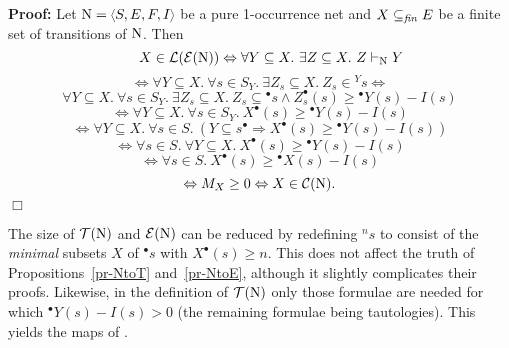 \documentclass[twocolumn]{article}
\newcommand{\out}[1]{}        \newcommand{\ams}[1]{#1}      \usepackage[preserveurlmacro]{breakurl}
\newtheorem{prop}{Proposition}[section]
\newenvironment{proposition}[1]{\begin{prop} \rm \label{pr-#1} }{\end{prop}}
\newenvironment{proof}{\begin{trivlist} \item[\hspace{\labelsep}\bf
Proof:]}{\hfill $\Box$\end{trivlist}}
\newcommand{\turn}{\vdash}                              \newcommand{\dbigcup}{\bigcup_{\uparrow}}		\newcommand{\nbigcup}{\bigcup_{\bullet}}		\newcommand{\nbigcap}{\bigcap_{\bullet}}		\newcommand{\bbigcup}{\overline{\bigcup}}		\newcommand{\bbigcap}{\overline{\bigcap}}		\newcommand{\nbbigcap}{\bbigcap_{\bullet}}		\newcommand{\fbbigcup}{\overline{\bigcup}^f}		\newcommand{\bbbigcup}{\overline{\bigcup}^2}		\newcommand{\dcup}{~~\makebox[0pt]{\LARGE$\cdot$}\makebox[0pt]{$\cup$}~~}
\begin{document}
\begin{proof}
Let $\eN=\tuple{S,E,F,I}$ be a pure 1-occurrence net and
$X\subseteq_{\it fin} E$ be a finite set of transitions of ${\rm N}$.
Then\vspace{-2em}$$$$
$$\mbox{~~~~~} X \in \fL(\fE(\eN)) \Leftrightarrow \forall Y\subseteq X.~
\exists Z \subseteq X.~ Z \turn_\eN Y$$
$$\Leftrightarrow\forall Y\subseteq X.~\forall s\in S_Y.~\exists Z_s
\subseteq X.~ Z_s\in\mbox{$^Y\!\!s$}\Leftrightarrow$$
$$\forall Y\!\subseteq\! X.~\forall s\!\in\! S_Y.~\exists Z_s
\!\subseteq\! X.~ Z_s \!\subseteq\! \mbox{$^\bullet s$} \wedge
Z_s^\bullet\!(s) \!\geq\! \mbox{$^\bullet Y\!(s)$}-I(s)$$
$$\Leftrightarrow\forall Y\!\subseteq\! X.~\forall s\!\in\! S_Y.~
X^\bullet\!(s) \geq \mbox{$^\bullet Y(s)$}-I(s)$$
$$\Leftrightarrow\forall Y\!\subseteq\! X.~\forall s\!\in\! S.~
(Y\!\subseteq\! s^\bullet \Rightarrow
X^\bullet\!(s) \geq \mbox{$^\bullet Y(s)$}-I(s))$$
$$\Leftrightarrow\forall s\!\in\! S.~\forall Y\!\subseteq\! X.~
X^\bullet\!(s) \geq \mbox{$^\bullet Y(s)$}-I(s)$$
$$\Leftrightarrow\forall s\!\in\! S.~X^\bullet\!(s) \geq
\mbox{$^\bullet\! X(s)$}-I(s)$$
$$\Leftrightarrow M_X \geq 0 \Leftrightarrow X \in \fC(\eN).\vspace{-1.7em}$$
\end{proof}
The size of ${\cal T}({\rm N})$ and ${\cal E}({\rm N})$ can be reduced by redefining
$^n\!s$ to consist of the \emph{minimal} subsets $X$ of
\mbox{$^\bullet\!s$} with $X^\bullet(s) \geq n$. This does not affect
the truth of Propositions~\ref{pr-NtoT} and~\ref{pr-NtoE}, although it
slightly complicates their proofs. Likewise, in the definition of
${\cal T}({\rm N})$ only those formulae 
are needed for which $^\bullet Y(s)-I(s)>0$ (the remaining formulae
being tautologies). This yields the maps of \cite{GP04}.

\out{
 Let $\fT'$ denote the thusly
 modified map from nets to propositional theories. The translations
 $\fN$ and $\fT'$ between propositional theories in conjunctive normal
 form and Petri nets preserve even more information than finite
 models/configurations:

 \begin{proposition}{TtoNtoT}
 Let $\eT$ be a rooted propositional theory WITH FINITE CONFLICT in
 conjunctive normal form. Then $\fT'(\fN(\eT))=\eT$.
 \end{proposition}

 \begin{proof}
 The pairs $(s,Y)$ with $s$ a place in $\fN(\eT)$ and $Y\subseteq_{\it
 fin} s^\bullet$ satisfying $^\bullet Y(s)-I(s)>0$ are exactly those
 with $s$ the place belonging to a clause $Y\implies X$ in $\eT$, and
 for all such pairs we have $^\bullet Y(s)-I(s)=1$. The formula
 generated by $\fT'$ is again $Y\implies X$.
 \end{proof}
}
\end{document}
